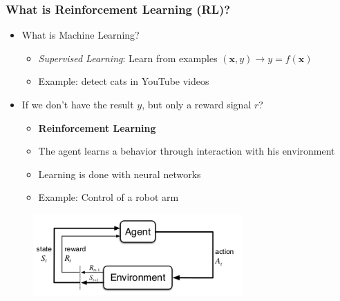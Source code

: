 \documentclass{beamer}
\begin{document}
\begin{frame}
\frametitle{What is Reinforcement Learning (RL)?}
\begin{itemize}
    \item What is Machine Learning?
        \begin{itemize}
            \item \emph{Supervised Learning}: Learn from examples $(\mathbf{x}, y) \rightarrow y = f(\mathbf{x})$
            \item Example: detect cats in YouTube videos
        \end{itemize}
    \pause
    \item If we don't have the result $y$, but only a reward signal $r$?
    \begin{itemize}
        \item \textbf{Reinforcement Learning}
        \item The agent learns a behavior through interaction with his environment
        \item Learning is done with neural networks
        \item Example: Control of a robot arm
    \end{itemize}
\end{itemize}
\begin{figure}[htp]
    \centering
    \includegraphics[width=8cm]{images/mdp.png}
    \label{fig:mdp}
\end{figure}
\end{frame}
\end{document}

